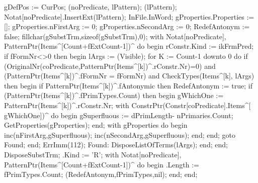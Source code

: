    gDefPos := CurPos;
   (noPredicate, lPattern);
   (lPattern);
   Notat[noPredicate].InsertExt(lPattern);
   InFile.InWord;
   gProperties.Properties := [];
   gProperties.nFirstArg := 0;
   gProperties.nSecondArg := 0;
   RedefAntonym := false;
   fillchar(gSubstTrm,sizeof(gSubstTrm),0);
   with Notat[noPredicate], PatternPtr(Items^[Count+fExtCount-1])^ do
   begin
      rConstr.Kind := ikFrmPred;
      if fFormNr<>0 then
      begin
         lArgs := (Visible);
         for K := Count-1 downto 0 do
            if (OriginalNr(coPredicate,PatternPtr(Items^[k])^.rConstr.Nr)=0) and
                  (PatternPtr(Items^[k])^.fFormNr = fFormNr) and
                  CheckTypes(Items^[k], lArgs)
            then
            begin
               if PatternPtr(Items^[k])^.fAntonymic then RedefAntonym := true;
               if (PatternPtr(Items^[k])^.fPrimTypes.Count) then
               begin
                  gWhichOne := PatternPtr(Items^[k])^.rConstr.Nr;
                  with ConstrPtr(Constr[coPredicate].Items^[ gWhichOne])^ do
                  begin
                     gSuperfluous := dPrimLength- nPrimaries.Count;
                     GetProperties(gProperties);
                  end;
                  with gProperties do
                  begin
                     inc(nFirstArg,gSuperfluous);
                     inc(nSecondArg,gSuperfluous);
                  end;
               end;
               goto Found;
            end;
         ErrImm(112);
         Found:
            DisposeListOfTerms(lArgs);
      end;
   end;
   DisposeSubstTrm;
   .Kind := 'R';
   with Notat[noPredicate], PatternPtr(Items^[Count+fExtCount-1])^ do
   begin
      .Length := fPrimTypes.Count;
      (RedefAntonym,fPrimTypes,nil);
   end;
end;
\eatline
{}\nwendcode{}\nwdocspar
